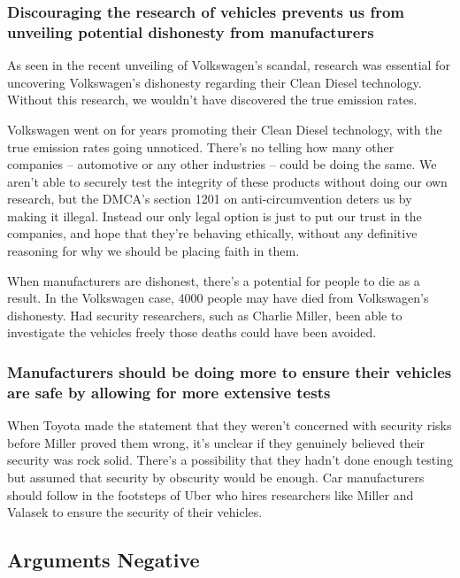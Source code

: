 \documentclass[12pt]{article}
\begin{document}
\begin{multicols}{2}
\subsubsection{Discouraging the research of vehicles prevents us from unveiling potential dishonesty from manufacturers}

As seen in the recent unveiling of Volkswagen's scandal, research was essential for uncovering Volkswagen's dishonesty regarding their Clean Diesel technology. \cite{vwScandal} Without this research, we wouldn't have discovered the true emission rates.

Volkswagen went on for years promoting their Clean Diesel technology, with the true emission rates going unnoticed. There's no telling how many other companies -- automotive or any other industries -- could be doing the same. We aren't able to securely test the integrity of these products without doing our own research, but the DMCA's section 1201 on anti-circumvention deters us by making it illegal. Instead our only legal option is just to put our trust in the companies, and hope  that they're behaving ethically, without any definitive reasoning for why we should be placing faith in them. \cite{brokeDMCA} 

When manufacturers are dishonest, there's a potential for people to die as a result. In the Volkswagen case, 4000 people may have died from Volkswagen's dishonesty.\cite{vwkills} Had security researchers, such as Charlie Miller, been able to investigate the vehicles freely those deaths could have been avoided.



\subsubsection{Manufacturers should be doing more to ensure their vehicles are safe by allowing for more extensive tests}

When Toyota made the statement that they weren't concerned with security risks \cite{originalHack} before Miller proved them wrong, it's unclear if they genuinely believed their security was rock solid. There's a possibility that they hadn't done enough testing but assumed that security by obscurity would be enough\cite{brokeDMCA}. Car manufacturers should follow in the footsteps of Uber who hires researchers like Miller and Valasek to ensure the security of their vehicles\cite{uber}.


\subsection{Arguments Negative}


\end{multicols}
\end{document}
